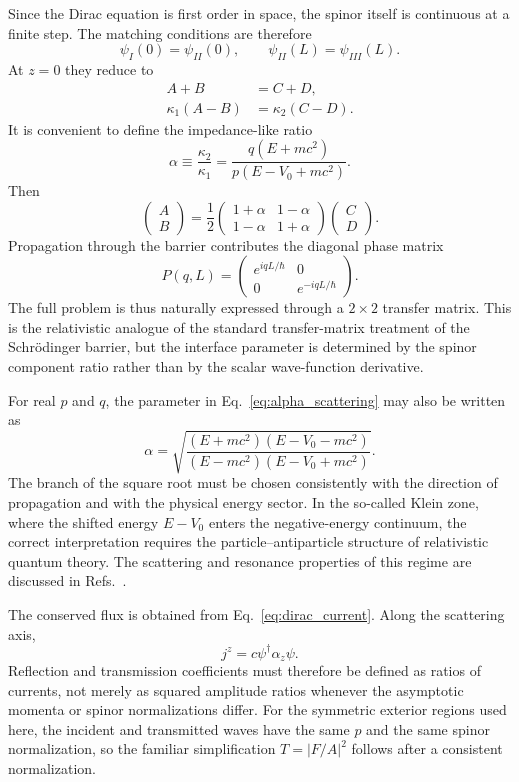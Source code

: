 \documentclass[12pt]{article}
\newcommand{\be}{\begin{equation}}
\newcommand{\ee}{\end{equation}}
\numberwithin{equation}{section}
\begin{document}
Since the Dirac equation is first order in space, the spinor itself is continuous at a finite step. The matching conditions are therefore
\be
 \psi_I(0)=\psi_{II}(0),
 \qquad
 \psi_{II}(L)=\psi_{III}(L).
\label{eq:matching}
\ee
At $z=0$ they reduce to
\begin{align}
 A+B&=C+D,\label{eq:match0a}\\
 \kappa_1(A-B)&=\kappa_2(C-D).\label{eq:match0b}
\end{align}
It is convenient to define the impedance-like ratio
\be
 \alpha\equiv\frac{\kappa_2}{\kappa_1}
 =\frac{q(E+mc^2)}{p(E-V_0+mc^2)}.
\label{eq:alpha_scattering}
\ee
Then
\be
 \begin{pmatrix}A\\B\end{pmatrix}
 =\frac{1}{2}
 \begin{pmatrix}
 1+\alpha&1-\alpha\\
 1-\alpha&1+\alpha
 \end{pmatrix}
 \begin{pmatrix}C\\D\end{pmatrix}.
\label{eq:interface_matrix}
\ee
Propagation through the barrier contributes the diagonal phase matrix
\be
 P(q,L)=
 \begin{pmatrix}
 e^{iqL/\hbar}&0\\
 0&e^{-iqL/\hbar}
 \end{pmatrix}.
\label{eq:propagation_matrix}
\ee
The full problem is thus naturally expressed through a $2\times2$ transfer matrix. This is the relativistic analogue of the standard transfer-matrix treatment of the Schr\"odinger barrier, but the interface parameter is determined by the spinor component ratio rather than by the scalar wave-function derivative.

For real $p$ and $q$, the parameter in Eq.~\eqref{eq:alpha_scattering} may also be written as
\be
 \alpha
 =\sqrt{
 \frac{(E+mc^2)(E-V_0-mc^2)}
 {(E-mc^2)(E-V_0+mc^2)}
 }.
\label{eq:alpha_explicit}
\ee
The branch of the square root must be chosen consistently with the direction of propagation and with the physical energy sector. In the so-called Klein zone, where the shifted energy $E-V_0$ enters the negative-energy continuum, the correct interpretation requires the particle--antiparticle structure of relativistic quantum theory. The scattering and resonance properties of this regime are discussed in Refs.~\cite{DeLeo2006,DeLeo2007}.

The conserved flux is obtained from Eq.~\eqref{eq:dirac_current}. Along the scattering axis,
\be
 j^z=c\psi^\dagger\alpha_z\psi.
\label{eq:jz}
\ee
Reflection and transmission coefficients must therefore be defined as ratios of currents, not merely as squared amplitude ratios whenever the asymptotic momenta or spinor normalizations differ. For the symmetric exterior regions used here, the incident and transmitted waves have the same $p$ and the same spinor normalization, so the familiar simplification $T=|F/A|^2$ follows after a consistent normalization.
\end{document}
